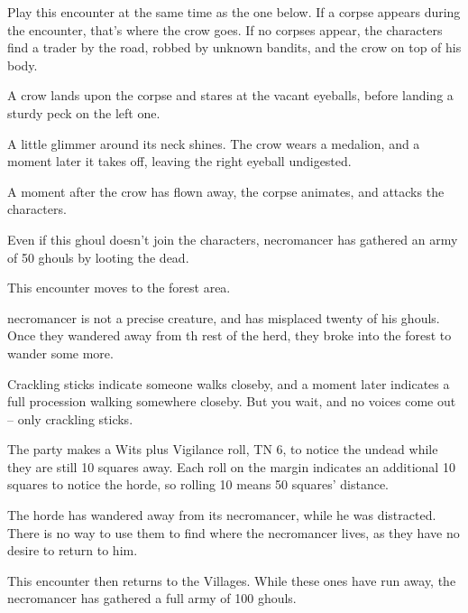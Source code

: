 \begin{multicols}{2}

Play this encounter at the same time as the one below.  If a corpse appears during the encounter, that's where the crow goes.  If no corpses appear, the characters find a trader by the road, robbed by unknown bandits, and the crow on top of his body.

\begin{boxtext}
	A crow lands upon the corpse and stares at the vacant eyeballs, before landing a sturdy peck on the left one.

	A little glimmer around its neck shines.  The crow wears a medalion, and a moment later it takes off, leaving the right eyeball undigested.

\end{boxtext}

A moment after the crow has flown away, the corpse animates, and attacks the characters.

\ghoul

Even if this ghoul doesn't join the characters, \gls{necromancer} has gathered an army of 50 ghouls by looting the dead.

This encounter moves to the forest area.


\Gls{necromancer} is not a precise creature, and has misplaced twenty of his ghouls.
Once they wandered away from th rest of the herd, they broke into the forest to wander some more.

\begin{boxtext}

	Crackling sticks indicate someone walks closeby, and a moment later indicates a full procession walking somewhere closeby.
	But you wait, and no voices come out -- only crackling sticks.

\end{boxtext}

The party makes a Wits plus Vigilance roll, TN 6, to notice the undead while they are still 10 squares away.
Each roll on the margin indicates an additional 10 squares to notice the horde, so rolling 10 means 50 squares' distance.

The horde has wandered away from its necromancer, while he was distracted.
There is no way to use them to find where the necromancer lives, as they have no desire to return to him.

This encounter then returns to the Villages.
While these ones have run away, the necromancer has gathered a full army of 100 ghouls.


\end{multicols}

